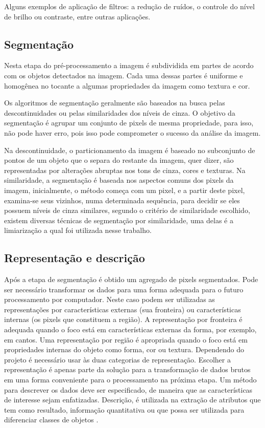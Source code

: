 Alguns exemplos de aplicação de filtros: a redução de ruídos, o controle do nível de brilho ou contraste, entre outras aplicações. 


\subsection{Segmentação}
\label{sub:segment}

Nesta etapa do pré-processamento a imagem é subdividida em partes de acordo com os objetos detectados na imagem. Cada uma dessas partes é uniforme e homogênea no tocante a algumas propriedades da imagem como textura e cor.

Os algoritmos de segmentação geralmente são baseados na busca pelas descontinuidades ou pelas similaridades dos níveis de cinza. \cite{digitalImgProcess2010} O objetivo da segmentação é agrupar um conjunto de pixels de mesma propriedade, para isso, não pode haver erro, pois isso pode comprometer o sucesso da análise da imagem.

Na descontinuidade, o particionamento da imagem é baseado no subconjunto de pontos de um objeto que o separa do restante da imagem, quer dizer, são representadas por alterações abruptas nos tons de cinza, cores e texturas. Na similaridade, a segmentação é baseada nos aspectos comuns dos pixels da imagem, inicialmente, o método começa com um pixel, e a partir deste pixel, examina-se seus vizinhos, numa determinada sequência, para decidir se eles possuem níveis de cinza similares, segundo o critério de similaridade escolhido, existem diversas técnicas de segmentação por similaridade, uma delas é a limiarização a qual foi utilizada nesse trabalho.


\subsection{Representação e descrição}
\label{sub:rep-desc}

Após a etapa de segmentação é obtido um agregado de pixels segmentados. Pode ser necessário transformar os dados para uma forma adequada para o futuro processamento por computador. Neste caso podem ser utilizadas as representações por características externas (sua fronteira) ou características internas (os pixels que constituem a região). A representação por fronteira é adequada quando o foco está em características externas da forma,  por exemplo, em cantos. Uma representação por região é apropriada quando o foco está em propriedades internas do objeto como forma, cor ou textura. Dependendo do projeto é necessário usar às duas categorias de representação. Escolher a representação é apenas parte da solução para a transformação de dados brutos em uma forma conveniente para o processamento na próxima etapa. Um método para descrever os dados deve ser especificado, de maneira que as características de interesse sejam enfatizadas. Descrição, é utilizada na extração de atributos que tem como resultado, informação quantitativa ou que possa ser utilizada para diferenciar classes de objetos \cite{digitalImgProcess2010}.

